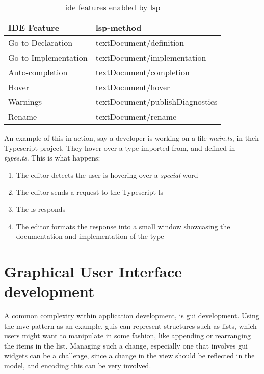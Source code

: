 \begin{table}[]
  \centering
  \caption{\gls*{ide} features enabled by \gls*{lsp}}
  \label{tbl:ide}
  \begin{tabular}{|l|l|}
    \hline
    IDE Feature & \gls*{lsp}-method \\ \hline
    Go to Declaration & textDocument/definition \\ \hline
    Go to Implementation & textDocument/implementation \\ \hline
    Auto-completion & textDocument/completion \\ \hline
    Hover & textDocument/hover \\ \hline
    Warnings & textDocument/publishDiagnostics \\ \hline
    Rename & textDocument/rename \\ \hline
  \end{tabular}
\end{table}

An example of this in action, say a developer is working on a file
\textit{main.ts}, in their Typescript project. They hover over a type imported
from, and defined in \textit{types.ts}. This is what happens:

\begin{enumerate}
  \item The editor detects the user is hovering over a \textit{special} word
  \item The editor sends a request to the Typescript \gls*{ls}
  \item The \gls*{ls} responds
  \item The editor formats the response into a small window showcasing the
    documentation and implementation of the type
\end{enumerate}


\section{Graphical User Interface development} \label{sec:guid}

A common complexity within application development, is \gls*{gui} development.
Using the \gls*{mvc}-pattern as an example, \gls*{gui}s can represent structures
such as lists, which users might want to manipulate in some fashion, like
appending or rearranging the items in the list. Managing such a change,
especially one that involves \gls*{gui} widgets can be a challenge, since a
change in the view should be reflected in the model, and encoding this can be
very involved.

